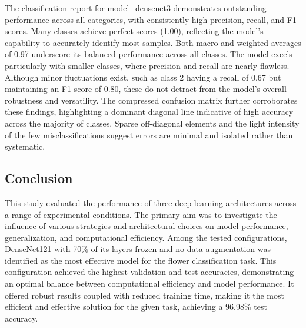 \vspace{0.3cm}

The classification report for model\_densenet3 demonstrates outstanding performance across all categories, with
consistently high precision, recall, and F1-scores. Many classes achieve perfect scores (1.00), reflecting the model's
capability to accurately identify most samples. Both macro and weighted averages of 0.97 underscore its balanced
performance across all classes. The model excels particularly with smaller classes, where precision and recall are
nearly flawless. Although minor fluctuations exist, such as class 2 having a recall of 0.67 but maintaining an F1-score of
0.80, these do not detract from the model's overall robustness and versatility.
The compressed confusion matrix further corroborates these findings, highlighting a dominant diagonal line indicative of high
accuracy across the majority of classes. Sparse off-diagonal elements and the light intensity of the few misclassifications
suggest errors are minimal and isolated rather than systematic.


\subsection{Conclusion}

This study evaluated the performance of three deep learning architectures across a range of experimental conditions.
The primary aim was to investigate the influence of various strategies and architectural choices on model performance,
generalization, and computational efficiency. Among the tested configurations, DenseNet121 with 70\% of its layers
frozen and no data augmentation was identified as the most effective model for the flower classification task. This
configuration achieved the highest validation and test accuracies, demonstrating an optimal balance between computational
efficiency and model performance. It offered robust results coupled with reduced training time, making it the most
efficient and effective solution for the given task, achieving a 96.98\% test accuracy.


